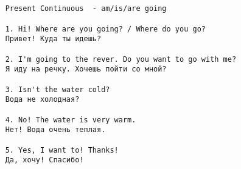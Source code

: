 \subsection*{}
\begin{verbatim}
    Present Continuous  - am/is/are going
    
    1. Hi! Where are you going? / Where do you go?
    Привет! Куда ты идешь?

    2. I'm going to the rever. Do you want to go with me?
    Я иду на речку. Хочешь пойти со мной?

    3. Isn't the water cold?
    Вода не холодная?

    4. No! The water is very warm.
    Нет! Вода очень теплая.

    5. Yes, I want to! Thanks!
    Да, хочу! Спасибо!
\end{verbatim}